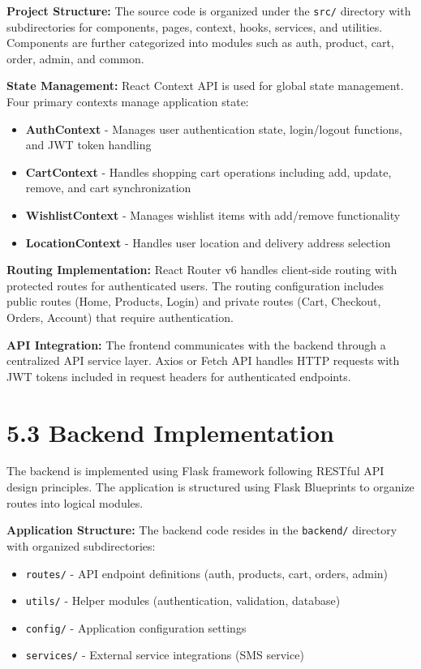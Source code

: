 \documentclass[12pt,a4paper]{report}
\begin{document}
\textbf{Project Structure:}
The source code is organized under the \texttt{src/} directory with subdirectories for components, pages, context, hooks, services, and utilities. Components are further categorized into modules such as auth, product, cart, order, admin, and common.

\textbf{State Management:}
React Context API is used for global state management. Four primary contexts manage application state:
\begin{itemize}
    \item \textbf{AuthContext} - Manages user authentication state, login/logout functions, and JWT token handling
    \item \textbf{CartContext} - Handles shopping cart operations including add, update, remove, and cart synchronization
    \item \textbf{WishlistContext} - Manages wishlist items with add/remove functionality
    \item \textbf{LocationContext} - Handles user location and delivery address selection
\end{itemize}

\textbf{Routing Implementation:}
React Router v6 handles client-side routing with protected routes for authenticated users. The routing configuration includes public routes (Home, Products, Login) and private routes (Cart, Checkout, Orders, Account) that require authentication.

\textbf{API Integration:}
The frontend communicates with the backend through a centralized API service layer. Axios or Fetch API handles HTTP requests with JWT tokens included in request headers for authenticated endpoints.

\section*{5.3 Backend Implementation}

The backend is implemented using Flask framework following RESTful API design principles. The application is structured using Flask Blueprints to organize routes into logical modules.

\textbf{Application Structure:}
The backend code resides in the \texttt{backend/} directory with organized subdirectories:
\begin{itemize}
    \item \texttt{routes/} - API endpoint definitions (auth, products, cart, orders, admin)
    \item \texttt{utils/} - Helper modules (authentication, validation, database)
    \item \texttt{config/} - Application configuration settings
    \item \texttt{services/} - External service integrations (SMS service)
\end{itemize}
\end{document}
